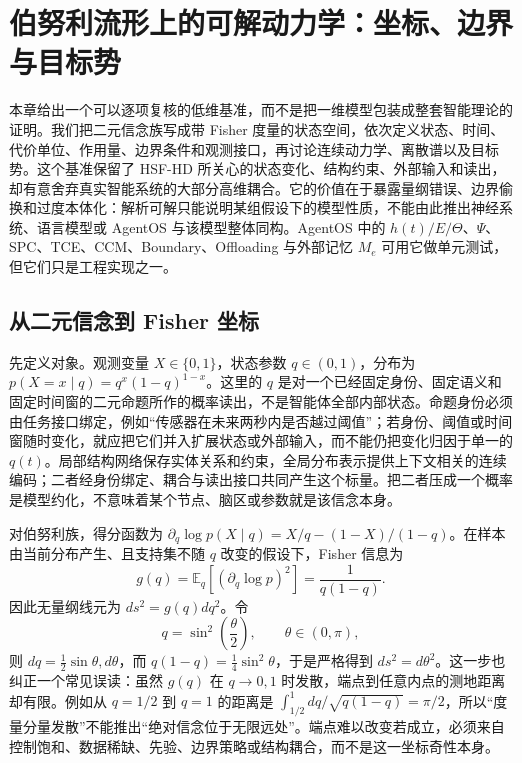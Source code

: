 \chapter{伯努利流形上的可解动力学：坐标、边界与目标势}
\label{chp:analytical_solution_bernoulli}

本章给出一个可以逐项复核的低维基准，而不是把一维模型包装成整套智能理论的证明。我们把二元信念族写成带 Fisher 度量的状态空间，依次定义状态、时间、代价单位、作用量、边界条件和观测接口，再讨论连续动力学、离散谱以及目标势。这个基准保留了 HSF-HD 所关心的状态变化、结构约束、外部输入和读出，却有意舍弃真实智能系统的大部分高维耦合。它的价值在于暴露量纲错误、边界偷换和过度本体化：解析可解只能说明某组假设下的模型性质，不能由此推出神经系统、语言模型或 AgentOS 与该模型整体同构。AgentOS 中的 $h(t)/E/\Theta$、$\Psi$、SPC、TCE、CCM、Boundary、Offloading 与外部记忆 $M_e$ 可用它做单元测试，但它们只是工程实现之一。

\section{从二元信念到 Fisher 坐标}
\label{sec:dimensional_reduction_bernoulli}

先定义对象。观测变量 $X\in\{0,1\}$，状态参数 $q\in(0,1)$，分布为 $p(X=x\mid q)=q^x(1-q)^{1-x}$。这里的 $q$ 是对一个已经固定身份、固定语义和固定时间窗的二元命题所作的概率读出，不是智能体全部内部状态。命题身份必须由任务接口绑定，例如“传感器在未来两秒内是否越过阈值”；若身份、阈值或时间窗随时变化，就应把它们并入扩展状态或外部输入，而不能仍把变化归因于单一的 $q(t)$。局部结构网络保存实体关系和约束，全局分布表示提供上下文相关的连续编码；二者经身份绑定、耦合与读出接口共同产生这个标量。把二者压成一个概率是模型约化，不意味着某个节点、脑区或参数就是该信念本身。

对伯努利族，得分函数为 $\partial_q\log p(X\mid q)=X/q-(1-X)/(1-q)$。在样本由当前分布产生、且支持集不随 $q$ 改变的假设下，Fisher 信息为
\[
g(q)=\mathbb E_q[(\partial_q\log p)^2]=\frac{1}{q(1-q)}.
\]
因此无量纲线元为 $ds^2=g(q)dq^2$。令
\begin{equation}\label{eq:bernoulli_transform}
q=\sin^2\!\left(\frac{\theta}{2}\right),\qquad \theta\in(0,\pi),
\end{equation}
则 $dq=\tfrac12\sin\theta,d\theta$，而 $q(1-q)=\tfrac14\sin^2\theta$，于是严格得到 $ds^2=d\theta^2$。这一步也纠正一个常见误读：虽然 $g(q)$ 在 $q\to0,1$ 时发散，端点到任意内点的测地距离却有限。例如从 $q=1/2$ 到 $q=1$ 的距离是 $\int_{1/2}^{1}dq/\sqrt{q(1-q)}=\pi/2$，所以“度量分量发散”不能推出“绝对信念位于无限远处”。端点难以改变若成立，必须来自控制饱和、数据稀缺、先验、边界策略或结构耦合，而不是这一坐标奇性本身。

